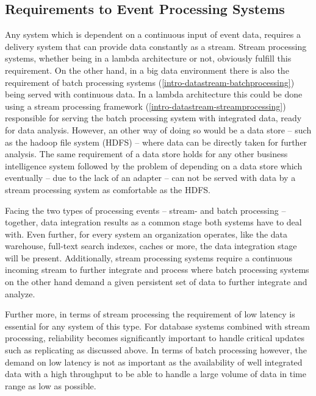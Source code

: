 \subsection{Requirements to Event Processing Systems}
Any system which is dependent on a continuous input of event data, requires a
delivery system that can provide data constantly as a stream. Stream
processing systems, whether being in a lambda architecture or not, obviously
fulfill this requirement. On the other hand, in a big data environment there is
also the requirement of batch processing systems
(\ref{intro-datastream-batchprocessing}) being served with continuous data. In a
lambda architecture this could be done using a stream processing framework
(\ref{intro-datastream-streamprocessing}) responsible for serving the batch
processing system with integrated data, ready for data analysis. However, an
other way of doing so would be a data store -- such as the hadoop file system
(HDFS) -- where data can be directly taken for further analysis.
The same requirement of a data store holds for any
other business intelligence system followed by the problem of depending on
a data store which eventually -- due to the lack of an adapter -- can not be
served with data by a stream processing system as comfortable as the HDFS.

Facing the two types of processing events -- stream- and batch
processing -- together, data integration results as a common stage both systems
have to deal with. Even further, for every system an organization operates, like
the data warehouse, full-text search indexes, caches or more, the data
integration stage will be present. Additionally, stream processing systems
require a continuous incoming stream to further integrate and process where
batch processing systems on the other hand demand a given persistent set of data
to further integrate and analyze.

Further more, in terms of stream processing the requirement of low latency is
essential for any system of this type. For database systems combined with stream
processing, reliability becomes significantly important to handle critical
updates such as replicating as discussed above. In terms of batch processing
however, the demand on low latency is not as important as the availability of
well integrated data with a high throughput to be able to handle a large volume
of data in time range as low as possible.


